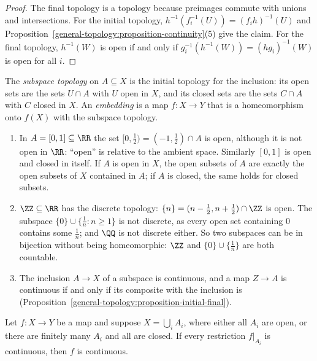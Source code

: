 \begin{proof}
The final topology is a topology because preimages commute with unions and intersections. For the initial topology, $h^{-1}(f_i^{-1}(U)) = (f_i h)^{-1}(U)$
and Proposition~\ref{general-topology:proposition-continuity}(5) give the claim. For the final topology, $h^{-1}(W)$ is open if and only if
$g_i^{-1}(h^{-1}(W)) = (hg_i)^{-1}(W)$ is open for all $i$.
\end{proof}

\begin{definition}\label{general-topology:definition-subspace}
The \emph{subspace topology} on $A \subseteq X$ is the initial topology for the inclusion: its open sets are the sets $U \cap A$ with $U$ open in
$X$, and its closed sets are the sets $C \cap A$ with $C$ closed in $X$. An \emph{embedding} is a map $f \colon X \to Y$ that is a homeomorphism
onto $f(X)$ with the subspace topology.
\end{definition}

\begin{example}\label{general-topology:example-subspaces}
\begin{enumerate}
\item In $A = [0, 1] \subseteq \RR$ the set $[0, \frac12) = (-1, \frac12) \cap A$ is open, although it is not open in $\RR$: ``open'' is relative to the ambient space. Similarly $[0, 1]$ is open and closed in
itself. If $A$ is open in $X$, the open subsets of $A$ are exactly the open subsets of $X$ contained in $A$; if $A$ is closed, the same holds for closed subsets.
\item $\ZZ \subseteq \RR$ has the discrete topology: $\{n\} = (n - \frac12, n + \frac12) \cap \ZZ$ is open. The subspace $\{0\} \cup \{\frac1n : n \geq 1\}$ is not discrete, as every open set containing
$0$ contains some $\frac1n$; and $\QQ$ is not discrete either. So two subspaces can be in bijection without being homeomorphic: $\ZZ$ and $\{0\} \cup \{\frac1n\}$ are both countable.
\item The inclusion $A \to X$ of a subspace is continuous, and a map $Z \to A$ is continuous if and only if its composite with the inclusion is (Proposition~\ref{general-topology:proposition-initial-final}).
\end{enumerate}
\end{example}

\begin{lemma}\label{general-topology:lemma-pasting}
Let $f \colon X \to Y$ be a map and suppose $X = \bigcup_i A_i$, where either all $A_i$ are open, or there are finitely many $A_i$ and all are closed.
If every restriction $f|_{A_i}$ is continuous, then $f$ is continuous.
\end{lemma}

